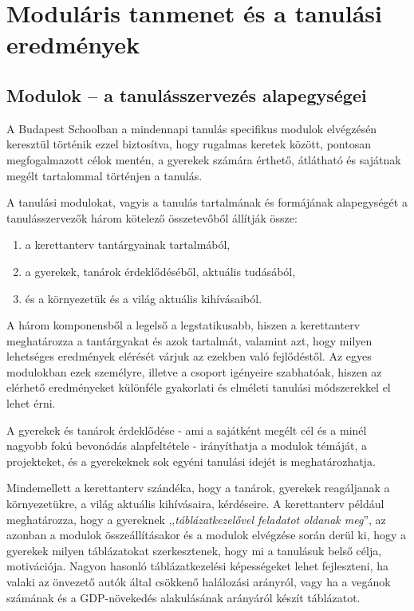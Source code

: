 \section{Moduláris tanmenet és a tanulási eredmények}

\subsection{Modulok -- a tanulásszervezés alapegységei}
\label{sec:modulok}

A Budapest Schoolban a mindennapi tanulás specifikus modulok elvégzésén
keresztül történik ezzel biztosítva, hogy rugalmas keretek között,
pontosan megfogalmazott célok mentén, a gyerekek számára érthető,
átlátható és sajátnak megélt tartalommal történjen a tanulás.

A tanulási modulokat, vagyis a tanulás tartalmának és formájának
alapegységét a tanulásszervezők három kötelező összetevőből állítják
össze:

\begin{enumerate}
  \item
        a kerettanterv tantárgyainak tartalmából,
  \item
        a gyerekek, tanárok érdeklődéséből, aktuális tudásából,
  \item
        és a környezetük és a világ aktuális kihívásaiból.
\end{enumerate}

A három komponensből a legelső a legstatikusabb, hiszen a kerettanterv
meghatározza a tantárgyakat és azok tartalmát, valamint azt, hogy milyen
lehetséges eredmények elérését várjuk az ezekben való fejlődéstől. Az
egyes modulokban ezek személyre, illetve a csoport igényeire szabhatóak,
hiszen az elérhető eredményeket különféle gyakorlati és elméleti
tanulási módszerekkel el lehet érni.

A gyerekek és tanárok érdeklődése - ami a sajátként megélt cél és a
minél nagyobb fokú bevonódás alapfeltétele - irányíthatja a modulok
témáját, a projekteket, és a gyerekeknek sok egyéni tanulási idejét is
meghatározhatja.

Mindemellett a kerettanterv szándéka, hogy a tanárok, gyerekek
reagáljanak a környezetükre, a világ aktuális kihívásaira, kérdéseire. A
kerettanterv például meghatározza, hogy a gyereknek ,,\emph{táblázatkezelővel
  feladatot oldanak meg}'', az azonban a
modulok összeállításakor és a modulok elvégzése során derül ki, hogy a
gyerekek milyen táblázatokat szerkesztenek, hogy mi a tanulásuk belső
célja, motivációja. Nagyon hasonló táblázatkezelési képességeket lehet
fejleszteni, ha valaki az önvezető autók által csökkenő halálozási
arányról, vagy ha a vegánok számának és a GDP-növekedés alakulásának
arányáról készít táblázatot.

